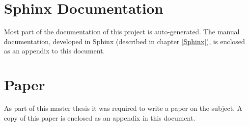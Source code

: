 \documentclass[11pt,a4paper,twoside,openright]{report}
\begin{document}
% 

%

\chapter{Sphinx Documentation}
\label{appendix_sphinx}
Most part of the documentation of this project is auto-generated.
The manual documentation, developed in Sphinx (described in chapter \ref{Sphinx}),
is enclosed as an appendix to this document.
\cleardoublepage


\chapter{Paper}
As part of this master thesis it was required to write a paper on the subject.
A copy of this paper is enclosed as an appendix in this document.
\cleardoublepage


% 
\end{document}

